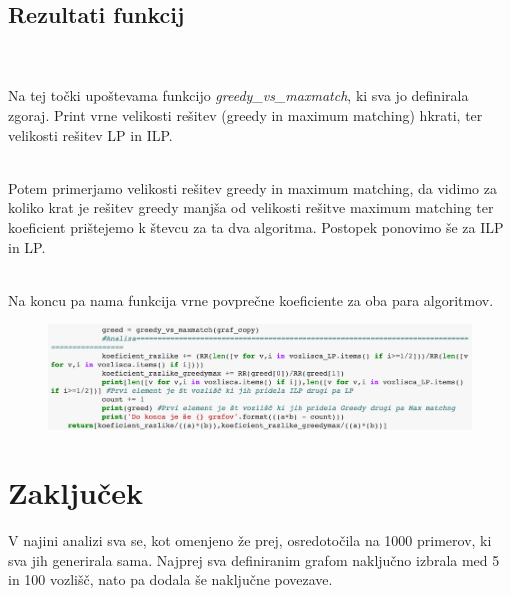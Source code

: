 \documentclass[12pt,a4paper]{amsart}
\theoremstyle{definition} %
\theoremstyle{plain} %
\begin{document}
\newpage

\subsection{Rezultati funkcij}
\
\\
\\
Na tej točki upoštevama funkcijo \textit{greedy\_vs\_maxmatch}, ki sva jo definirala zgoraj. Print vrne velikosti rešitev (greedy in maximum matching) hkrati, ter velikosti rešitev LP in ILP.

 \hspace*{\fill} %
\\ 
Potem primerjamo velikosti rešitev greedy in maximum matching, da vidimo za koliko krat je rešitev greedy manjša od velikosti rešitve maximum matching ter koeficient prištejemo k števcu za ta dva algoritma. Postopek ponovimo še za ILP in LP. 

 \hspace*{\fill} %
\\ 
Na koncu pa nama funkcija vrne povprečne koeficiente za oba para algoritmov.


\begin{figure}[ht]
\centering
\includegraphics[width=1\textwidth]{Screen6.png}
\end{figure}




\newpage



\section{Zaključek}

V najini analizi sva se, kot omenjeno že prej, osredotočila na 1000 primerov, ki sva jih generirala sama. Najprej sva definiranim grafom naključno izbrala med 5 in 100 vozlišč, nato pa dodala še naključne povezave.

\hspace*{\fill} %
\end{document}

